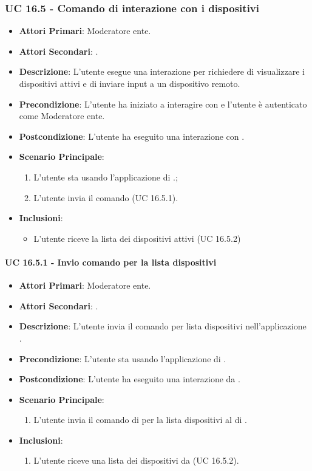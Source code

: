 	\subsubsection{UC 16.5 - Comando di interazione con i dispositivi}
	\begin{itemize}
		\item \textbf{Attori Primari}: Moderatore ente.
		\item \textbf{Attori Secondari}: .
		\item \textbf{Descrizione}: L'utente esegue una interazione per richiedere di visualizzare i dispositivi attivi e di inviare input a un dispositivo remoto. 
		\item \textbf{Precondizione}: L'utente ha iniziato a interagire con  e l'utente è autenticato come Moderatore ente.
		\item \textbf{Postcondizione}: L'utente ha eseguito una interazione con .
		\item \textbf{Scenario Principale}:
		\begin{enumerate}
			\item L'utente sta usando l'applicazione di .;
			\item L'utente invia il comando (UC 16.5.1).
		\end{enumerate}
		\item \textbf{Inclusioni}:
		\begin{itemize}
			\item L'utente riceve la lista dei dispositivi attivi (UC 16.5.2)
		\end{itemize}
	\end{itemize}


		\paragraph{UC 16.5.1 - Invio comando per la lista dispositivi}
		\begin{itemize}
			\item \textbf{Attori Primari}: Moderatore ente.
			\item \textbf{Attori Secondari}: .
			\item \textbf{Descrizione}: L'utente invia il comando per lista dispositivi nell'applicazione .
			\item \textbf{Precondizione}: L'utente sta usando l'applicazione di .
			\item \textbf{Postcondizione}: L'utente ha eseguito una interazione da .
			\item \textbf{Scenario Principale}:
			\begin{enumerate}
				\item L'utente invia il comando di per la lista dispositivi al  di .
			\end{enumerate}
			\item \textbf{Inclusioni}:
			\begin{enumerate}
				\item L'utente riceve una lista dei dispositivi da  (UC 16.5.2).
			\end{enumerate}
		\end{itemize}


